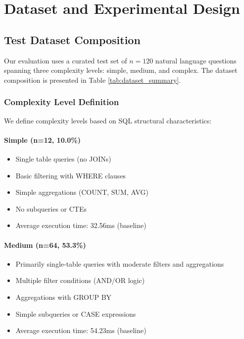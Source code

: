 \section{Dataset and Experimental Design}
\label{sec:dataset}

\subsection{Test Dataset Composition}

Our evaluation uses a curated test set of $n=120$ natural language questions spanning three complexity levels: simple, medium, and complex. The dataset composition is presented in Table \ref{tab:dataset_summary}.



\subsubsection{Complexity Level Definition}

We define complexity levels based on SQL structural characteristics:

\paragraph{Simple (n=12, 10.0\%)}
\begin{itemize}
    \item Single table queries (no JOINs)
    \item Basic filtering with WHERE clauses
    \item Simple aggregations (COUNT, SUM, AVG)
    \item No subqueries or CTEs
    \item Average execution time: 32.56ms (baseline)
\end{itemize}

\paragraph{Medium (n=64, 53.3\%)}
\begin{itemize}
    \item Primarily single-table queries with moderate filters and aggregations
    \item Multiple filter conditions (AND/OR logic)
    \item Aggregations with GROUP BY
    \item Simple subqueries or CASE expressions
    \item Average execution time: 54.23ms (baseline)
\end{itemize}

